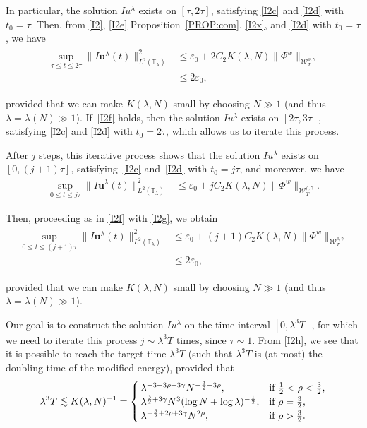 \documentclass[letterpaper, 11pt,  reqno]{amsart}
\newcommand{\1}{\hspace{0.5mm}\text{I}\hspace{0.5mm}}
\newcommand{\noi}{\noindent}
\newcommand{\T}{\mathbb{T}}
\newcommand{\eps}{\varepsilon}
\newcommand{\g}{\gamma}
\newcommand{\ld}{\lambda}
\newcommand{\les}{\lesssim}
\newcommand{\W}{\mathcal{W}}
\newcommand{\uu}{\mathbf{u}}
\numberwithin{equation}{section}
\numberwithin{theorem}{section}
\begin{document}
\noi
In particular, the solution $Iu^\ld$ exists on $[\tau,  2\tau]$, 
satisfying 
\eqref{I2c} and \eqref{I2d}
with $t_0 = \tau$.
Then,  
from 
\eqref{I2}, \eqref{I2e} 
Proposition~\ref{PROP:com}, 
 \eqref{I2x}, and \eqref{I2d} with $t_0 = \tau$, we have 
\begin{align}
\begin{split}
 \sup_{\tau\le t\le2 \tau} \| I \uu^\ld(t) \|^2_{L^2(\T_\ld)} 
&  \le \eps_0 + 
2 C_2 K(\ld, N)   \|  \Phi^{w}  \|_{\W_{T}^{\rho, \g}}   \\
&  \le 2\eps_0, 
\end{split}
\label{I2f}
\end{align}


\noi
provided that 
we can make 
 $K(\ld, N)$  small by 
choosing $N \gg 1$
(and thus $\ld = \ld(N) \gg1$).
If~\eqref{I2f} holds, 
then 
the solution $Iu^\ld$ exists on $[2\tau, 3\tau]$, 
satisfying 
\eqref{I2c} and \eqref{I2d}
with $t_0 = 2\tau$, 
which allows us to iterate this process.

After $j$ steps, 
this iterative process shows that 
the solution $Iu^\ld$ exists on $[0, (j+1)\tau]$, 
satisfying~\eqref{I2c} and~\eqref{I2d}
 with $t_0 = j \tau$, and moreover, we have 
\begin{align}
 \sup_{0 \le t\le j \tau} \| I \uu^\ld(t) \|^2_{L^2(\T_\ld)} 
&  \le \eps_0 + 
j C_2 K(\ld, N)   \|  \Phi^{w}  \|_{\W_{T}^{\rho, \g}}.
\label{I2g}
\end{align}

\noi
Then, proceeding as in \eqref{I2f} with \eqref{I2g}, we obtain
\begin{align}
\begin{split}
 \sup_{0 \le t\le(j+1) \tau} \| I \uu^\ld(t) \|^2_{L^2(\T_\ld)} 
&  \le \eps_0 + 
(j+1) C_2 K(\ld, N)   \|  \Phi^{w}  \|_{\W_{T}^{\rho, \g}}   \\
&  \le 2\eps_0, 
\end{split}
\label{I2h}
\end{align}


\noi
provided that 
we can make 
 $K(\ld, N)$  small by 
choosing $N \gg 1$
(and thus $\ld = \ld(N) \gg1$).


Our goal is to construct the solution $Iu^\ld$ on the time interval $[0, \ld^3 T]$, 
for which we need to iterate this process $j \sim \ld^3 T$ times, 
since  $\tau \sim1$.
From \eqref{I2h}, 
we see that 
 it is possible 
to reach the target time $\ld^3 T$
(such that $\ld^3T$ is (at most) the doubling time
of the modified energy), 
provided that 
\begin{align}
\ld^3T\les  K(\ld, N)^{-1}
= \begin{cases}
\ld^{- 3+ 3\rho+3\g} N^{-\frac 32 + 3\rho}, & \text{if $\frac 12 < \rho < \frac 32$}, \\
\ld^{\frac 32 + 3\g} N^{3} (\log N + \log \ld)^{-\frac 12}, & \text{if $\rho =  \frac 32$}, \\
\ld^{ -\frac 32 + 2\rho +3\g} N^{2\rho}, & \text{if $ \rho >  \frac 32$}.
\end{cases}
\label{IT0b}
\end{align}
\end{document}
